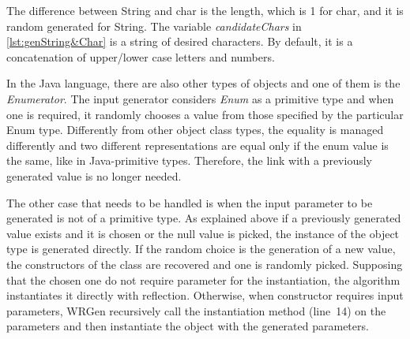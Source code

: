
The difference between String and char is the length, which is 1 for char, and it is random generated for String. The variable \emph{candidateChars} in \autoref{lst:genString&Char} is a string of desired characters. By default, it is a concatenation of upper/lower case letters and numbers.

In the Java language, there are also other types of objects and one of them is the \textit{Enumerator}. The input generator considers \textit{Enum} as a primitive type and when one is required, it randomly chooses a value from those specified by the particular Enum type. Differently from other object class types, the equality is managed differently and two different representations are equal only if the enum value is the same, like in Java-primitive types. Therefore, the link with a previously generated value is no longer needed.



The other case that needs to be handled is when the input parameter to be generated is not of a primitive type.
As explained above if a previously generated value exists and it is chosen or the null value is picked, the instance of the object type is generated directly.
If the random choice is the generation of a new value, the constructors of the class are recovered and one is randomly picked. Supposing that the chosen one do not require parameter for the instantiation, the algorithm instantiates it directly with reflection.
Otherwise, when constructor requires input parameters, WRGen recursively call the instantiation method (line~14) on the parameters and then instantiate the object with the generated parameters.

